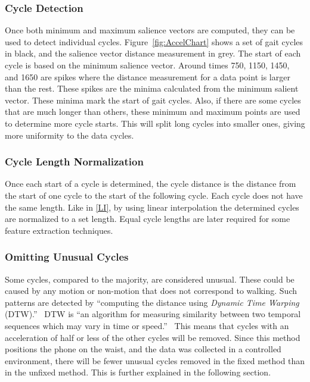 \documentclass{sig-alternate}
\begin{document}
\subsubsection{Cycle Detection}
	Once both minimum and maximum salience vectors are computed, they can be used to detect individual cycles. Figure~\ref{fig:AccelChart} shows a set of gait cycles in black, and the salience vector distance measurement in grey. The start of each cycle is based on the minimum salience vector. Around times 750, 1150, 1450, and 1650 are spikes where the distance measurement for a data point is larger than the rest. These spikes are the minima calculated from the minimum salient vector. These minima mark the start of gait cycles. Also, if there are some cycles that are much longer than others, these minimum and maximum points are used to determine more cycle starts. This will split long cycles into smaller ones, giving more uniformity to the data cycles.

\begin{figure*}
\centering
{}
\caption{Minimum Salient Vectors}
\label{fig:AccelChart}
\end{figure*}

			
\subsubsection{Cycle Length Normalization}
Once each start of a cycle is determined, the cycle distance is the distance from the start of one cycle to the start of the following cycle. Each cycle does not have the same length. Like in \ref{LI}, by using linear interpolation the determined cycles are normalized to a set length. Equal cycle lengths are later required for some feature extraction techniques. 
			
\subsubsection{Omitting Unusual Cycles}
Some cycles, compared to the majority, are considered unusual. These could be caused by any motion or non-motion that does not correspond to walking. Such patterns are detected by ``computing the distance using \textit{Dynamic Time Warping} (DTW).''~\cite{Muaaz:2013} DTW is ``an algorithm for measuring similarity between two temporal sequences which may vary in time or speed.''~\cite{wiki2:2014} This means that cycles with an acceleration of half or less of the other cycles will be removed. Since this method positions the phone on the waist, and the data was collected in a controlled environment, there will be fewer unusual cycles removed in the fixed method than in the unfixed method. This is further explained in the following section.
\end{document}
